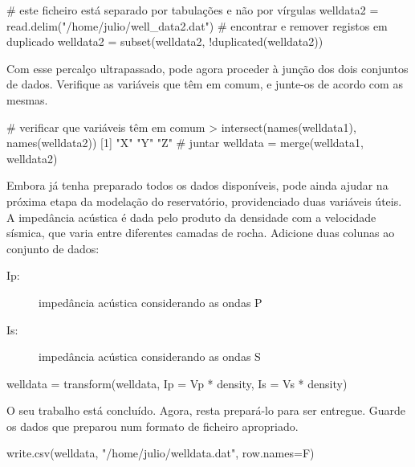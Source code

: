 \documentclass{exam}
\begin{document}
\begin{questions}
	\begin{solution}
		\begin{rcode}
			# este ficheiro está separado por tabulações e não por vírgulas
			welldata2 = read.delim("/home/julio/well_data2.dat")
			# encontrar e remover registos em duplicado
			welldata2 = subset(welldata2, !duplicated(welldata2))
		\end{rcode}
	\end{solution}
	
	\question Com esse percalço ultrapassado, pode agora proceder à junção dos dois conjuntos de dados. Verifique as variáveis que têm em comum, e junte-os de acordo com as mesmas.
	\begin{solution}
		\begin{rcode}
			# verificar que variáveis têm em comum
			> intersect(names(welldata1), names(welldata2))
			[1] "X" "Y" "Z"
			# juntar
			welldata = merge(welldata1, welldata2)
			
		\end{rcode}
	\end{solution}
	
	\question Embora já tenha preparado todos os dados disponíveis, pode ainda ajudar na próxima etapa da modelação do reservatório, providenciado duas variáveis úteis. A impedância acústica é dada pelo produto da densidade com a velocidade sísmica, que varia entre diferentes camadas de rocha. Adicione duas colunas ao conjunto de dados:
	\begin{description}
		\item[Ip:] impedância acústica considerando as ondas P
		\item[Is:] impedância acústica considerando as ondas S
	\end{description}
	
	\begin{solution}
		\begin{rcode}
			welldata = transform(welldata, Ip = Vp * density, Is = Vs * density)
		\end{rcode}
	\end{solution}
	
	\question O seu trabalho está concluído. Agora, resta prepará-lo para ser entregue. Guarde os dados que preparou num formato de ficheiro apropriado.
	
	\begin{solution}
		\begin{rcode}
			write.csv(welldata, "/home/julio/welldata.dat", row.names=F)
		\end{rcode}
	\end{solution}

\end{questions}
\end{document}
